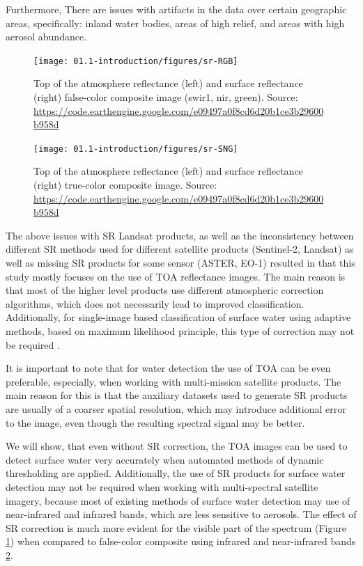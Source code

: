 Furthermore, There are issues with artifacts in the data over certain geographic areas, specifically: inland water bodies, areas of high relief, and areas with high aerosol abundance. 

\begin{figure}
	\texttt{[image: 01.1-introduction/figures/sr-RGB]}
	\caption{Top of the atmosphere reflectance (left) and surface reflectance (right) false-color composite image (swir1, nir, green). Source: \url{https://code.earthengine.google.com/e09497a0f8cd6d20b1ce3b29600b958d}}
	\label{fig:example-sr-rgb}
\end{figure}

\begin{figure}
	\texttt{[image: 01.1-introduction/figures/sr-SNG]}
	\caption{Top of the atmosphere reflectance (left) and surface reflectance (right) true-color composite image. Source: \url{https://code.earthengine.google.com/e09497a0f8cd6d20b1ce3b29600b958d}}
	\label{fig:example-sr-sng}
\end{figure}

The above issues with SR Landsat products, as well as the inconsistency between different SR methods used for different satellite products (Sentinel-2, Landsat) as well as missing SR products for some sensor (ASTER, EO-1) resulted in that this study mostly focuses on the use of TOA reflectance images. The main reason is that most of the higher level products use different atmospheric correction algorithms, which does not necessarily lead to improved classification. Additionally, for single-image based classification of surface water using adaptive methods, based on maximum likelihood principle, this type of correction may not be required \citep{song2001classification}.

It is important to note that for water detection the use of TOA can be even preferable, especially, when working with multi-mission satellite products. The main reason for this is that the auxiliary datasets used to generate SR products are usually of a coarser spatial resolution, which may introduce additional error to the image, even though the resulting spectral signal may be better. 

We will show, that even without SR correction, the TOA images can be used to detect surface water very accurately when automated methods of dynamic thresholding are applied. Additionally, the use of SR products for surface water detection may not be required when working with multi-spectral satellite imagery, because most of existing methods of surface water detection may use of near-infrared and infrared bands, which are less sensitive to aerosols. The effect of SR correction is much more evident for the visible part of the spectrum (Figure \ref{fig:example-sr-rgb}) when compared to false-color composite using infrared and near-infrared bands \ref{fig:example-sr-sng}.

